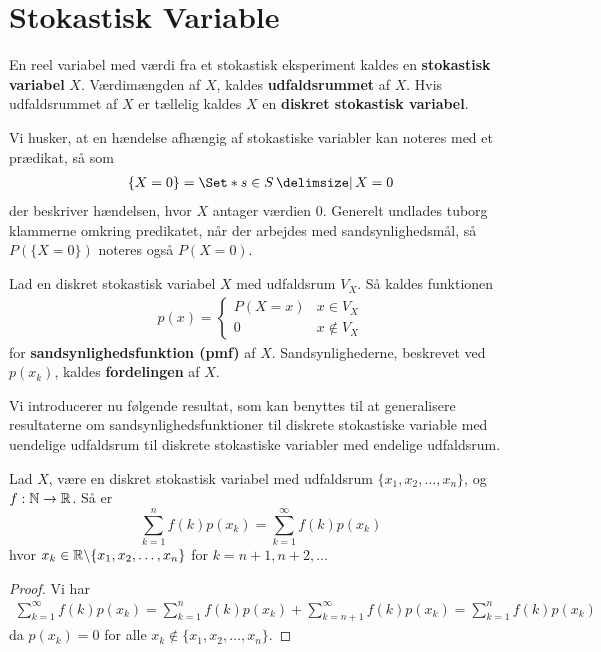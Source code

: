 \section{Stokastisk Variable} \label{sec:SV}
\begin{defn}%
En reel variabel med værdi fra et stokastisk eksperiment kaldes en \textbf{stokastisk variabel} $X$. Værdimængden af $X$, kaldes \textbf{udfaldsrummet} af $X$. Hvis udfaldsrummet af $X$ er tællelig kaldes $X$ en \textbf{diskret stokastisk variabel}.
\end{defn}

Vi husker, at en hændelse afhængig af stokastiske variabler kan noteres med et prædikat, så som
\begin{align*}
    \{X=0\}=\Set*{s\in S\given X=0}
\end{align*}
der beskriver hændelsen, hvor $X$ antager værdien $0$.
Generelt undlades tuborg klammerne omkring predikatet, når der arbejdes med sandsynlighedsmål, så $P(\{X = 0\})$ noteres også $P(X = 0)$.

\begin{defn} [Sandsynlighedsfunktion]%
    Lad en diskret stokastisk variabel $X$ med udfaldsrum $V_X$. Så kaldes funktionen
\begin{align*}
    p(x)=
    \begin{cases}
        P(X=x) & x\in V_X\\
        0 & x\not\in V_X
    \end{cases}
\end{align*}
for \textbf{sandsynlighedsfunktion (pmf)} af $X$. Sandsynlighederne, beskrevet ved $p(x_k)$, kaldes \textbf{fordelingen} af $X$.
\end{defn}
Vi introducerer nu følgende resultat, som kan benyttes til at generalisere resultaterne om sandsynlighedsfunktioner til diskrete stokastiske variable med uendelige udfaldsrum til diskrete stokastiske variabler med endelige udfaldsrum.
\begin{lem}
Lad $X$, være en diskret stokastisk variabel med udfaldsrum $\{x_1, x_2, \ldots, x_n\}$, og $f: \mathbb{N} \to \mathbb{R}$. Så er 
\begin{equation*}
    \sum^n_{k = 1} f(k) p(x_k) = \sum^\infty_{k = 1} f(k) p(x_k)
\end{equation*}
hvor $x_k \in \mathbb{R} \backslash \{x_1, x_2, \ldots, x_n\}$ for $k = n + 1, n + 2, \ldots$
\end{lem}
\begin{proof}
Vi har 
\begin{align*}
    \sum^\infty_{k = 1} f(k) p(x_k) =\sum^n_{k = 1} f(k) p(x_k) + \sum^\infty_{k = n + 1} f(k) p(x_k) = \sum^n_{k = 1} f(k) p(x_k) 
\end{align*}
da $p(x_k) = 0$ for alle $x_k \not \in \{x_1, x_2, \ldots, x_n\}$.
\end{proof}



